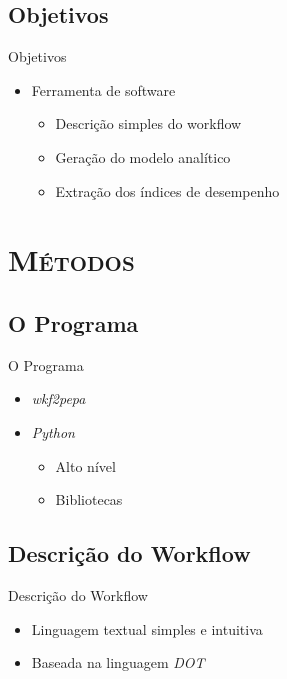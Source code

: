 \documentclass[xcolor=x11names,compress]{beamer}
\renewcommand{\(}{\begin{columns}}
\renewcommand{\)}{\end{columns}}
\newcommand{\<}[1]{\begin{column}{#1}}
\renewcommand{\>}{\end{column}}
\begin{document}
    \subsection{Objetivos}
        \begin{frame}{Objetivos}
            \begin{itemize}[<+->]
                \item Ferramenta de software
                    \begin{itemize}
                        \item Descrição simples do workflow
                        \item Geração do modelo analítico
                        \item Extração dos índices de desempenho
                    \end{itemize}
            \end{itemize}
        \end{frame}

\section{\scshape Métodos}

    \subsection{O Programa}
        \begin{frame}{O Programa}
            \begin{itemize}[<+->]
                \item \emph{wkf2pepa}
                \item \emph{Python}
                    \begin{itemize}
                        \item Alto nível
                        \item Bibliotecas
                    \end{itemize}
            \end{itemize}
        \end{frame}

    \subsection{Descrição do Workflow}
        \begin{frame}{Descrição do Workflow}
            \begin{itemize}[<+->]
                \item Linguagem textual simples e intuitiva
                \item Baseada na linguagem \emph{DOT}
            \end{itemize}
        \end{frame}
\end{document}
